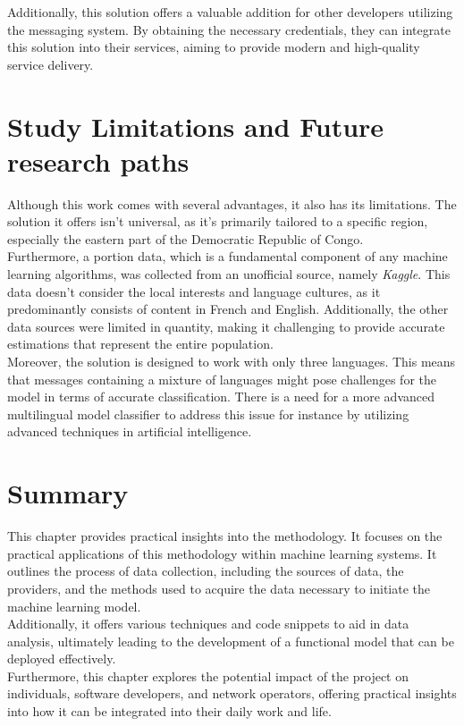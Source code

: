 \documentclass[12pt,a4paper, oneside]{book}
\begin{document}
Additionally, this solution offers a valuable addition for other developers utilizing the messaging system. By obtaining the necessary credentials, they can integrate this solution into their services, aiming to provide modern and high-quality service delivery.
\section{Study Limitations and Future research paths} 
Although this work comes with several advantages, it also has its limitations. The solution it offers isn't universal, as it's primarily tailored to a specific region, especially the eastern part of the Democratic Republic of Congo.\\

Furthermore, a portion data, which is a fundamental component of any machine learning algorithms, was collected from an unofficial source, namely \textit{Kaggle}. This data doesn't consider the local interests and language cultures, as it predominantly consists of content in French and English. Additionally, the other data sources were limited in quantity, making it challenging to provide accurate estimations that represent the entire population.\\

Moreover, the solution is designed to work with only three languages. This means that messages containing a mixture of languages might pose challenges for the model in terms of accurate classification. There is a need for a more advanced multilingual model classifier to address this issue for instance by utilizing advanced techniques in artificial intelligence.
 
\section{Summary}
This chapter provides practical insights into the methodology. It focuses on the practical applications of this methodology within machine learning systems. It outlines the process of data collection, including the sources of data, the providers, and the methods used to acquire the data necessary to initiate the machine learning model.\\

Additionally, it offers various techniques and code snippets to aid in data analysis, ultimately leading to the development of a functional model that can be deployed effectively.\\

Furthermore, this chapter explores the potential impact of the project on individuals, software developers, and network operators, offering practical insights into how it can be integrated into their daily work and life.\\
\end{document}
